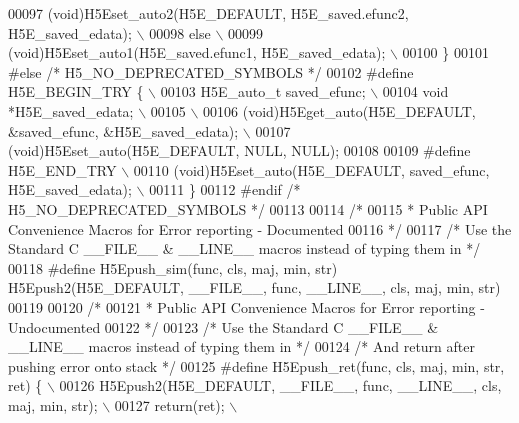\begin{DoxyCode}
00097 \textcolor{preprocessor}{        (void)H5Eset\_auto2(H5E\_DEFAULT, H5E\_saved.efunc2, H5E\_saved\_edata);   \(\backslash\)}
00098 \textcolor{preprocessor}{    else                                      \(\backslash\)}
00099 \textcolor{preprocessor}{        (void)H5Eset\_auto1(H5E\_saved.efunc1, H5E\_saved\_edata);            \(\backslash\)}
00100 \textcolor{preprocessor}{\}}
00101 \textcolor{preprocessor}{#else }\textcolor{comment}{/* H5\_NO\_DEPRECATED\_SYMBOLS */}\textcolor{preprocessor}{}
00102 \textcolor{preprocessor}{#define H5E\_BEGIN\_TRY \{                               \(\backslash\)}
00103 \textcolor{preprocessor}{    H5E\_auto\_t saved\_efunc;                           \(\backslash\)}
00104 \textcolor{preprocessor}{    void *H5E\_saved\_edata;                            \(\backslash\)}
00105 \textcolor{preprocessor}{                                              \(\backslash\)}
00106 \textcolor{preprocessor}{    (void)H5Eget\_auto(H5E\_DEFAULT, &saved\_efunc, &H5E\_saved\_edata);       \(\backslash\)}
00107 \textcolor{preprocessor}{    (void)H5Eset\_auto(H5E\_DEFAULT, NULL, NULL);}
00108 
00109 \textcolor{preprocessor}{#define H5E\_END\_TRY                               \(\backslash\)}
00110 \textcolor{preprocessor}{    (void)H5Eset\_auto(H5E\_DEFAULT, saved\_efunc, H5E\_saved\_edata);         \(\backslash\)}
00111 \textcolor{preprocessor}{\}}
00112 \textcolor{preprocessor}{#endif }\textcolor{comment}{/* H5\_NO\_DEPRECATED\_SYMBOLS */}\textcolor{preprocessor}{}
00113 
00114 \textcolor{comment}{/*}
00115 \textcolor{comment}{ * Public API Convenience Macros for Error reporting - Documented}
00116 \textcolor{comment}{ */}
00117 \textcolor{comment}{/* Use the Standard C \_\_FILE\_\_ & \_\_LINE\_\_ macros instead of typing them in */}
00118 \textcolor{preprocessor}{#define H5Epush\_sim(func, cls, maj, min, str) H5Epush2(H5E\_DEFAULT, \_\_FILE\_\_, func, \_\_LINE\_\_, cls, maj,
       min, str)}
00119 
00120 \textcolor{comment}{/*}
00121 \textcolor{comment}{ * Public API Convenience Macros for Error reporting - Undocumented}
00122 \textcolor{comment}{ */}
00123 \textcolor{comment}{/* Use the Standard C \_\_FILE\_\_ & \_\_LINE\_\_ macros instead of typing them in */}
00124 \textcolor{comment}{/*  And return after pushing error onto stack */}
00125 \textcolor{preprocessor}{#define H5Epush\_ret(func, cls, maj, min, str, ret) \{                  \(\backslash\)}
00126 \textcolor{preprocessor}{    H5Epush2(H5E\_DEFAULT, \_\_FILE\_\_, func, \_\_LINE\_\_, cls, maj, min, str);      \(\backslash\)}
00127 \textcolor{preprocessor}{    return(ret);                                  \(\backslash\)}

\end{DoxyCode}
